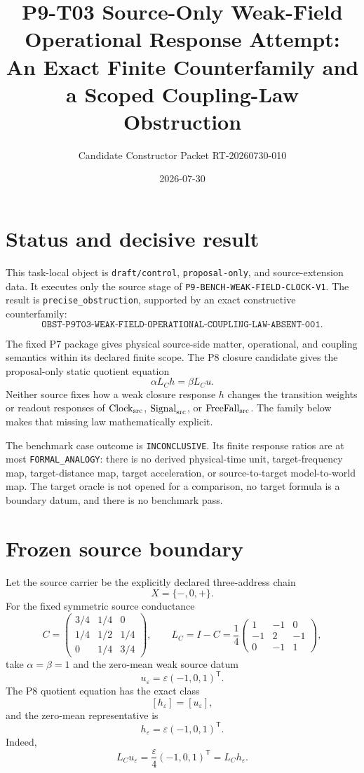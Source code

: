 \documentclass[11pt]{article}
\title{P9-T03 Source-Only Weak-Field Operational Response Attempt:\\
An Exact Finite Counterfamily and a Scoped Coupling-Law Obstruction}
\author{Candidate Constructor Packet RT-20260730-010}
\date{2026-07-30}
\begin{document}
\sloppy
\maketitle

\section{Status and decisive result}

This task-local object is \texttt{draft/control}, \texttt{proposal-only},
and source-extension data.  It executes only the source stage of
\texttt{P9-BENCH-WEAK-FIELD-CLOCK-V1}.  The result is
\texttt{precise\_obstruction}, supported by an exact constructive
counterfamily:
\[
 \boxed{\texttt{OBST-P9T03-WEAK-FIELD-OPERATIONAL-COUPLING-LAW-ABSENT-001}}.
\]

The fixed P7 package gives physical source-side matter, operational, and
coupling semantics within its declared finite scope.  The P8 closure candidate
gives the proposal-only static quotient equation
\[
 \alpha L_C h=\beta L_C u.
\]
Neither source fixes how a weak closure response \(h\) changes the transition
weights or readout responses of \(\mathrm{Clock}_{\rm src}\),
\(\mathrm{Signal}_{\rm src}\), or \(\mathrm{FreeFall}_{\rm src}\).
The family below makes that missing law mathematically explicit.

The benchmark case outcome is \texttt{INCONCLUSIVE}.  Its finite response
ratios are at most \texttt{FORMAL\_ANALOGY}: there is no derived physical-time
unit, target-frequency map, target-distance map, target acceleration, or
source-to-target model-to-world map.  The target oracle is not opened for a
comparison, no target formula is a boundary datum, and there is no benchmark
pass.

\section{Frozen source boundary}

Let the source carrier be the explicitly declared three-address chain
\[
 X=\{-,0,+\}.
\]
For the fixed symmetric source conductance
\[
 C=\begin{pmatrix}
  3/4&1/4&0\\
  1/4&1/2&1/4\\
  0&1/4&3/4
 \end{pmatrix},
 \qquad
 L_C=I-C
 =\frac14\begin{pmatrix}
  1&-1&0\\
  -1&2&-1\\
  0&-1&1
 \end{pmatrix},
\]
take \(\alpha=\beta=1\) and the zero-mean weak source datum
\[
 u_\varepsilon=\varepsilon(-1,0,1)^{\mathsf T}.
\]
The P8 quotient equation has the exact class
\[
 [h_\varepsilon]=[u_\varepsilon],
\]
and the zero-mean representative is
\[
 h_\varepsilon=\varepsilon(-1,0,1)^{\mathsf T}.
\]
Indeed,
\[
 L_Cu_\varepsilon
 =\frac{\varepsilon}{4}(-1,0,1)^{\mathsf T}
 =L_Ch_\varepsilon .
\]
\end{document}
